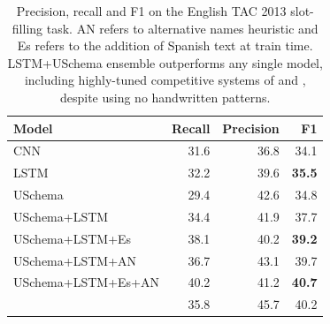 \begin{table}[tb]
\setlength{\tabcolsep}{4.1pt}
\begin{center}
\begin{tabular}{|lrrr|}
\hline
\bf Model & \bf Recall & \bf Precision & \bf F1 \\
\hline\hline
CNN                 & 31.6 & 36.8 & 34.1 \\
LSTM                & 32.2 & 39.6 & \bf 35.5  \\
USchema             & 29.4 & 42.6 & 34.8 \\
\hline\hline
USchema+LSTM        & 34.4 & 41.9 & 37.7 \\
USchema+LSTM+Es        & 38.1 & 40.2 & \bf 39.2 \\
\hline\hline
USchema+LSTM+AN	& 36.7 & 43.1 & 39.7 \\
USchema+LSTM+Es+AN & 40.2 & 41.2 & \bf 40.7 \\
\citet{roth2014relationfactory} & 35.8 & 45.7 & 40.2 \\

\hline
\end{tabular}
\caption{Precision, recall and F1 on the English TAC 2013 slot-filling task. AN refers to alternative names heuristic and Es refers to the addition of Spanish text at train time. LSTM+USchema ensemble outperforms any single model, including highly-tuned competitive systems of \protect\citet{roth2014relationfactory} and \protect\citet{angeli2014stanford}, despite using no handwritten patterns.  %
\label{en-tac-table}}
\end{center}
\end{table}

